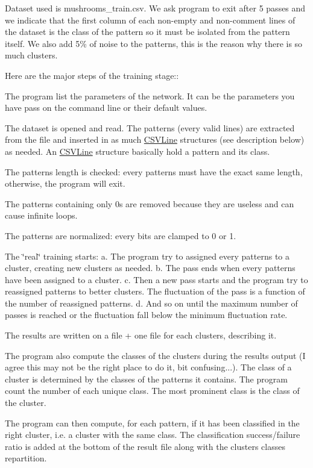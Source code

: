 Dataset used is mushrooms\-\_\-train.\-csv. We ask program to exit after 5 passes and we indicate that the first column of each non-\/empty and non-\/comment lines of the dataset is the class of the pattern so it must be isolated from the pattern itself. We also add 5\% of noise to the patterns, this is the reason why there is so much clusters.

Here are the major steps of the training stage\-:\-:


\begin{DoxyEnumerate}
\item The program list the parameters of the network. It can be the parameters you have pass on the command line or their default values.
\item The dataset is opened and read. The patterns (every valid lines) are extracted from the file and inserted in as much \hyperlink{struct_c_s_v_line}{C\-S\-V\-Line} structures (see description below) as needed. An \hyperlink{struct_c_s_v_line}{C\-S\-V\-Line} structure basically hold a pattern and its class.
\item The patterns length is checked\-: every patterns must have the exact same length, otherwise, the program will exit.
\end{DoxyEnumerate}
\begin{DoxyEnumerate}
\item The patterns containing only 0s are removed because they are useless and can cause infinite loops.
\item The patterns are normalized\-: every bits are clamped to 0 or 1.
\item The \char`\"{}real\char`\"{} training starts\-: a. The program try to assigned every patterns to a cluster, creating new clusters as needed. b. The pass ends when every patterns have been assigned to a cluster. c. Then a new pass starts and the program try to reassigned patterns to better clusters. The fluctuation of the pass is a function of the number of reassigned patterns. d. And so on until the maximum number of passes is reached or the fluctuation fall below the minimum fluctuation rate.
\item The results are written on a file + one file for each clusters, describing it.
\item The program also compute the classes of the clusters during the results output (I agree this may not be the right place to do it, bit confusing...). The class of a cluster is determined by the classes of the patterns it contains. The program count the number of each unique class. The most prominent class is the class of the cluster.
\item The program can then compute, for each pattern, if it has been classified in the right cluster, i.\-e. a cluster with the same class. The classification success/failure ratio is added at the bottom of the result file along with the clusters classes repartition.
\end{DoxyEnumerate}

